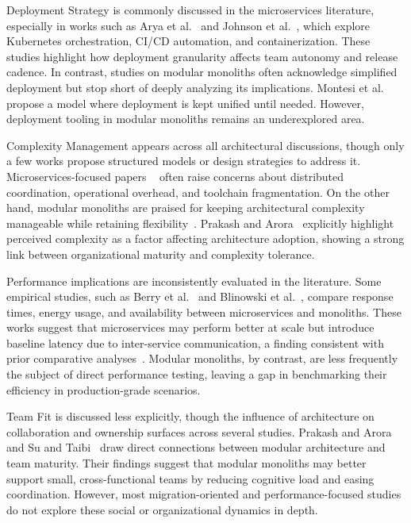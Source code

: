 Deployment Strategy is commonly discussed in the microservices literature, especially in works such as Arya et al.~\cite{arya2024beyond} and Johnson et al.~\cite{johnson2024serviceweaver}, which explore Kubernetes orchestration, CI/CD automation, and containerization. These studies highlight how deployment granularity affects team autonomy and release cadence. In contrast, studies on modular monoliths often acknowledge simplified deployment but stop short of deeply analyzing its implications. Montesi et al.~\cite{montesi2021sliceable} propose a model where deployment is kept unified until needed. However, deployment tooling in modular monoliths remains an underexplored area.

Complexity Management appears across all architectural discussions, though only a few works propose structured models or design strategies to address it. Microservices-focused papers ~\cite{su2024from} often raise concerns about distributed coordination, operational overhead, and toolchain fragmentation. On the other hand, modular monoliths are praised for keeping architectural complexity manageable while retaining flexibility~\cite{montesi2021sliceable, celozzi2020}. Prakash and Arora~\cite{prakash2024systematic} explicitly highlight perceived complexity as a factor affecting architecture adoption, showing a strong link between organizational maturity and complexity tolerance.

Performance implications are inconsistently evaluated in the literature. Some empirical studies, such as Berry et al.~\cite{berry2024isItWorth} and Blinowski et al.~\cite{blinowski2022monolithic}, compare response times, energy usage, and availability between microservices and monoliths. These works suggest that microservices may perform better at scale but introduce baseline latency due to inter-service communication, a finding consistent with prior comparative analyses~\cite{jatkiewicz2023differences}. Modular monoliths, by contrast, are less frequently the subject of direct performance testing, leaving a gap in benchmarking their efficiency in production-grade scenarios.

Team Fit is discussed less explicitly, though the influence of architecture on collaboration and ownership surfaces across several studies. Prakash and Arora~\cite{prakash2024systematic} and Su and Taibi~\cite{su2024from} draw direct connections between modular architecture and team maturity. Their findings suggest that modular monoliths may better support small, cross-functional teams by reducing cognitive load and easing coordination. However, most migration-oriented and performance-focused studies do not explore these social or organizational dynamics in depth.

